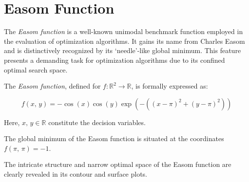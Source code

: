 \section{Easom Function}
\label{sec:app:test:easom}

The \emph{Easom function} is a well-known unimodal benchmark function employed 
in the evaluation of optimization algorithms.
It gains its name from Charles Easom and is distinctively recognized by its 
`needle'-like global minimum.
This feature presents a demanding task for optimization algorithms due to its
confined optimal search space.

\begin{definition}
  \label{def:app:test:easom}
  The \emph{Easom function}, defined for \(f: \mathbb{R}^2 \rightarrow 
  \mathbb{R}\), is formally expressed as:

  \begin{equation}
    \label{eq:app:test:easom}
    f(x,\, y) = -\cos(x)\cos(y)\exp\left(-((x-\pi)^2+(y-\pi)^2)\right)
  \end{equation}
  
  Here, \(x,\, y \in \mathbb{R}\) constitute the decision variables.
\end{definition}

The global minimum of the Easom function is situated at the coordinates 
\(f(\pi,\, \pi) = -1\).

The intricate structure and narrow optimal space of the Easom function are
clearly revealed in its contour and surface plots. 

